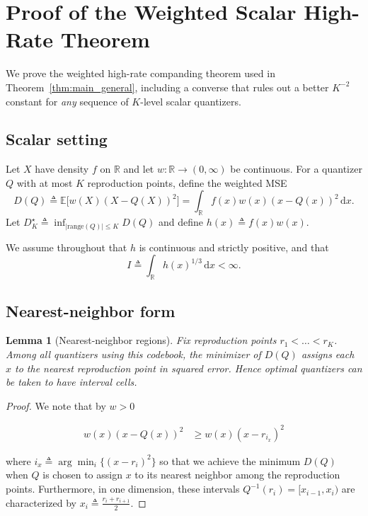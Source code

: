 \documentclass{article}
\newtheorem{lemma}{Lemma}
\newcommand{\E}{\mathbb{E}}
\newcommand{\R}{\mathbb{R}}
\newcommand{\abs}[1]{\left\lvert #1 \right\rvert}
\newcommand{\dd}{\,\mathrm{d}}
\newcommand{\defeq}{\triangleq}
\begin{document}
\section{Proof of the Weighted Scalar High-Rate Theorem}\label{app:proof_scalar_theorem}
We prove the weighted high-rate companding theorem used in Theorem~\ref{thm:main_general}, including a converse that rules out a better $K^{-2}$ constant for \emph{any} sequence of $K$-level scalar quantizers.

\subsection{Scalar setting}
Let $X$ have density $f$ on $\R$ and let $w:\R\to(0,\infty)$ be continuous. For a quantizer $Q$ with at most $K$ reproduction points, define the weighted MSE
\[
D(Q)\defeq \E\big[w(X)(X-Q(X))^2\big]=\int_{\R} f(x)w(x)(x-Q(x))^2\dd x.
\]
Let $D_K^\star\defeq \inf_{\abs{\mathrm{range}(Q)}\le K} D(Q)$ and define $h(x)\defeq f(x)w(x)$.

We assume throughout that $h$ is continuous and strictly positive, and that
\begin{equation}\label{eq:scalar_I_finite}
I\defeq \int_{\R} h(x)^{1/3}\dd x < \infty.
\end{equation}

\subsection{Nearest-neighbor form}
\begin{lemma}[Nearest-neighbor regions]\label{lem:nn_app}
Fix reproduction points $r_1<\dots<r_K$. Among all quantizers using this codebook, the minimizer of $D(Q)$ assigns each $x$ to the nearest reproduction point in squared error. Hence optimal quantizers can be taken to have interval cells.
\end{lemma}
\begin{proof}

We note that by $w > 0$

\begin{align*}
w(x) (x - Q(x))^2 &\geq w(x) (x - r_{i_x})^2    
\end{align*}

where $i_x \defeq \arg\min_{i} \{(x - r_i)^2\}$ so that we achieve the minimum $D(Q)$ when $Q$ is chosen to assign $x$ to its nearest neighbor among the reproduction points. Furthermore, in one dimension, these intervals $ Q^{-1}(r_i) = [x_{i-1}, x_i)$ are characterized by $x_i \defeq \frac{r_i + r_{i+1}}{2}$.

\end{proof}
\end{document}
